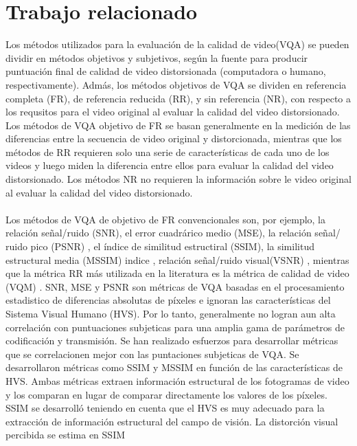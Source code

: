 \documentclass[conference]{IEEEtran}
\begin{document}
\section{Trabajo relacionado}
    Los métodos utilizados para la evaluación de la calidad de video(VQA) se 
    pueden dividir en métodos objetivos y subjetivos, según la fuente para producir 
    puntuación final de calidad de video distorsionada (computadora o humano, 
    respectivamente). Admás, los métodos objetivos de VQA se dividen en referencia 
    completa (FR), de referencia reducida (RR), y sin referencia (NR), con respecto a los 
    requsitos para el video original al evaluar la calidad del video distorsionado. Los métodos 
    de VQA objetivo de FR se basan generalmente en la medición de las diferencias 
    entre la secuencia de video original y distorcionada, mientras que los métodos 
    de RR requieren solo una serie de características de cada uno de los videos y 
    luego miden la diferencia entre ellos para evaluar la calidad del video 
    distorsionado. Los métodos NR no requieren la información sobre le video 
    original al evaluar la calidad del video distorsionado.\\
    \\
    Los métodos de VQA de objetivo de FR convencionales son, por ejemplo, la 
    relación señal/ruido (SNR), el error cuadrárico medio (MSE), la relación señal/
    ruido pico (PSNR) \cite{biblio7}, el índice de similitud estructiral (SSIM), la similitud estructural 
    media (MSSIM) indice \cite{biblio8}, relación señal/ruido visual(VSNR) \cite{biblio9}, mientras que la 
    métrica RR más utilizada en la literatura es la métrica de calidad de video (VQM) \cite{biblio7}.
    SNR, MSE y PSNR son métricas de VQA basadas en el procesamiento estadistico 
    de diferencias absolutas de píxeles e ignoran las características del Sistema Visual 
    Humano (HVS). Por lo tanto, generalmente no logran aun alta correlación con 
    puntuaciones subjeticas para una amplia gama de parámetros de codificación y 
    transmisión. Se han realizado esfuerzos para desarrollar métricas que se 
    correlacionen mejor con las puntaciones subjeticas de VQA. Se desarrollaron 
    métricas como SSIM y MSSIM en función de las características de HVS. Ambas 
    métricas extraen información estructural de los fotogramas de video y los comparan 
    en lugar de comparar directamente los valores de los píxeles. SSIM se desarrolló 
    teniendo en cuenta que el HVS es muy adecuado para la extracción de información 
    estructural del campo de visión. La distorción visual percibida se estima en SSIM 
\end{document}
